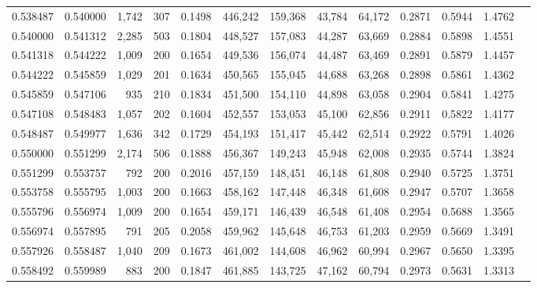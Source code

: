 \begin{tabular}{rrrrrrrrrrrrr}
0.538487 & 0.540000 & 1,742 & 307 &                                     0.1498 & 446,242 & 159,368 &  43,784 &  64,172 & 0.2871 & 0.5944 & 1.4762 \\
0.540000 & 0.541312 & 2,285 & 503 &                                     0.1804 & 448,527 & 157,083 &  44,287 &  63,669 & 0.2884 & 0.5898 & 1.4551 \\
0.541318 & 0.544222 & 1,009 & 200 &                                     0.1654 & 449,536 & 156,074 &  44,487 &  63,469 & 0.2891 & 0.5879 & 1.4457 \\
0.544222 & 0.545859 & 1,029 & 201 &                                     0.1634 & 450,565 & 155,045 &  44,688 &  63,268 & 0.2898 & 0.5861 & 1.4362 \\
0.545859 & 0.547106 &   935 & 210 &                                     0.1834 & 451,500 & 154,110 &  44,898 &  63,058 & 0.2904 & 0.5841 & 1.4275 \\
0.547108 & 0.548483 & 1,057 & 202 &                                     0.1604 & 452,557 & 153,053 &  45,100 &  62,856 & 0.2911 & 0.5822 & 1.4177 \\
0.548487 & 0.549977 & 1,636 & 342 &                                     0.1729 & 454,193 & 151,417 &  45,442 &  62,514 & 0.2922 & 0.5791 & 1.4026 \\
0.550000 & 0.551299 & 2,174 & 506 &                                     0.1888 & 456,367 & 149,243 &  45,948 &  62,008 & 0.2935 & 0.5744 & 1.3824 \\
0.551299 & 0.553757 &   792 & 200 &                                     0.2016 & 457,159 & 148,451 &  46,148 &  61,808 & 0.2940 & 0.5725 & 1.3751 \\
0.553758 & 0.555795 & 1,003 & 200 &                                     0.1663 & 458,162 & 147,448 &  46,348 &  61,608 & 0.2947 & 0.5707 & 1.3658 \\
0.555796 & 0.556974 & 1,009 & 200 &                                     0.1654 & 459,171 & 146,439 &  46,548 &  61,408 & 0.2954 & 0.5688 & 1.3565 \\
0.556974 & 0.557895 &   791 & 205 &                                     0.2058 & 459,962 & 145,648 &  46,753 &  61,203 & 0.2959 & 0.5669 & 1.3491 \\
0.557926 & 0.558487 & 1,040 & 209 &                                     0.1673 & 461,002 & 144,608 &  46,962 &  60,994 & 0.2967 & 0.5650 & 1.3395 \\
0.558492 & 0.559989 &   883 & 200 &                                     0.1847 & 461,885 & 143,725 &  47,162 &  60,794 & 0.2973 & 0.5631 & 1.3313 \\

\end{tabular}
